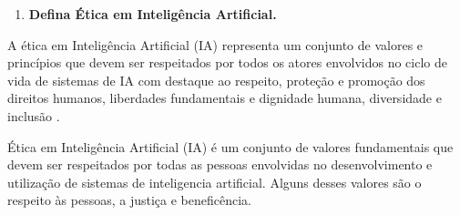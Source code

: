 \begin{enumerate}\bfseries
    \item \textbf{Defina Ética em Inteligência Artificial. }
\end{enumerate}

A ética em Inteligência Artificial (IA) representa um conjunto de valores e princípios que devem ser respeitados por todos os atores envolvidos no ciclo de vida de sistemas de IA com destaque ao respeito, proteção e promoção dos direitos humanos, liberdades fundamentais e dignidade humana, diversidade e inclusão \cite{unesco_ethics_ai}.

Ética em Inteligência Artificial (IA) é um conjunto de valores fundamentais que devem ser respeitados por todas as pessoas envolvidas no desenvolvimento e utilização de sistemas de inteligencia artificial. Alguns desses valores são o respeito às pessoas, a justiça e beneficência. 

